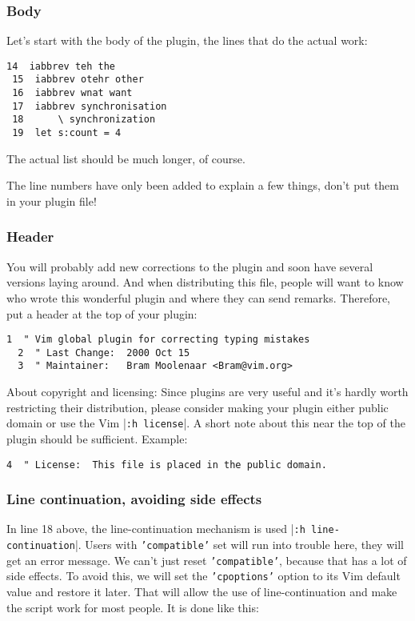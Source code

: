 \subsubsection{Body}
Let's start with the body of the plugin, the lines that do the actual work:

\begin{Verbatim}[samepage=true]
 14  iabbrev teh the
 15  iabbrev otehr other
 16  iabbrev wnat want
 17  iabbrev synchronisation
 18      \ synchronization
 19  let s:count = 4
\end{Verbatim}

The actual list should be much longer, of course.

The line numbers have only been added to explain a few things, don't put them in your plugin file!
\subsubsection{Header}
You will probably add new corrections to the plugin and soon have several versions laying around.
And when distributing this file, people will want to know who wrote this wonderful plugin and where they can send remarks.
Therefore, put a header at the top of your plugin:

\begin{Verbatim}[samepage=true]
  1  " Vim global plugin for correcting typing mistakes
  2  " Last Change:  2000 Oct 15
  3  " Maintainer:   Bram Moolenaar <Bram@vim.org>
\end{Verbatim}

About copyright and licensing: Since plugins are very useful and it's hardly worth restricting their distribution, please consider making your plugin either public domain or use the Vim |\texttt{:h license}|.
A short note about this near the top of the plugin should be sufficient.
Example:

\begin{Verbatim}[samepage=true]
  4  " License:  This file is placed in the public domain.
\end{Verbatim}

\subsubsection{Line continuation, avoiding side effects}
\label{use-cpo-save}

In line 18 above, the line-continuation mechanism is used |\texttt{:h line-continuation}|.
Users with \texttt{'compatible'} set will run into trouble here, they will get an error message.
We can't just reset \texttt{'compatible'}, because that has a lot of side effects.
To avoid this, we will set the \texttt{'cpoptions'} option to its Vim default value and restore it later.
That will allow the use of line-continuation and make the script work for most people.
It is done like this:


